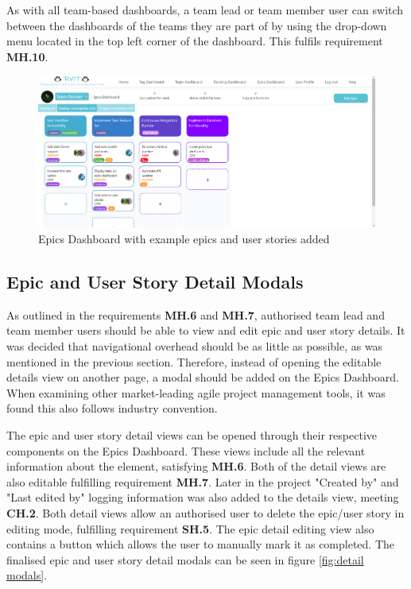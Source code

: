 \documentclass[l4proj.tex]{subfiles}
\begin{document}
As with all team-based dashboards, a team lead or team member user can switch between the dashboards of the teams they are part of by using the drop-down menu located in the top left corner of the dashboard. This fulfils requirement \textbf{MH.10}.

\begin{figure}[h!]
\begin{center}
\includegraphics[scale=0.35]{dissertation/images/EpicsDashboard.png}
\caption{Epics Dashboard with example epics and user stories added}
\label{fig:epics dashboard} 
\end{center}
\end{figure}

\subsection{Epic and User Story Detail Modals}
As outlined in the requirements \textbf{MH.6} and \textbf{MH.7}, authorised team lead and team member users should be able to view and edit epic and user story details. It was decided that navigational overhead should be as little as possible, as was mentioned in the previous section. Therefore, instead of opening the editable details view on another page, a modal should be added on the Epics Dashboard. When examining other market-leading agile project management tools, it was found this also follows industry convention. 

The epic and user story detail views can be opened through their respective components on the Epics Dashboard. These views include all the relevant information about the element, satisfying \textbf{MH.6}. Both of the detail views are also editable fulfilling requirement \textbf{MH.7}. Later in the project "Created by" and "Last edited by" logging information was also added to the details view, meeting \textbf{CH.2}. Both detail views allow an authorised user to delete the epic/user story in editing mode, fulfilling requirement \textbf{SH.5}. The epic detail editing view also contains a button which allows the user to manually mark it as completed. The finalised epic and user story detail modals can be seen in figure \ref{fig:detail modals}.
\end{document}
